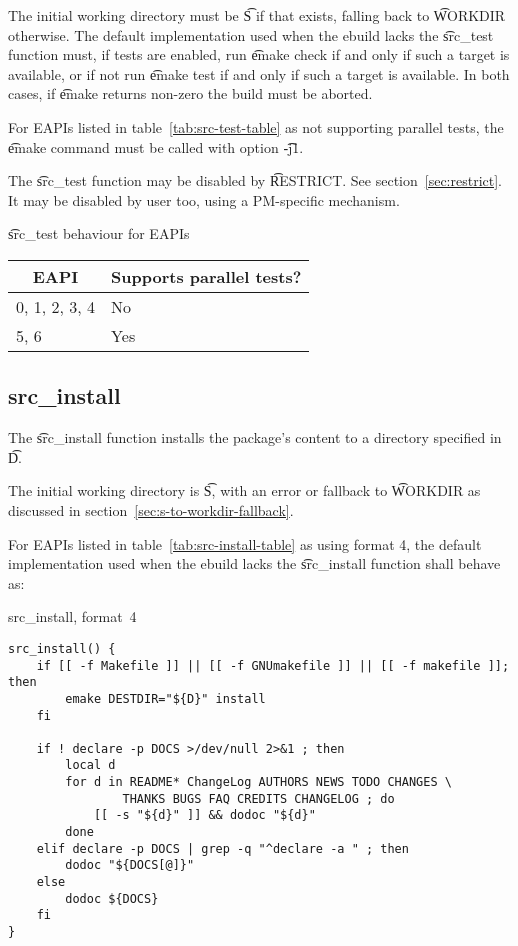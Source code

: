 The initial working directory must be \t{S} if that exists, falling back to \t{WORKDIR} otherwise.
The default implementation used when the ebuild lacks the \t{src\_test} function must, if tests are
enabled, run \t{emake check} if and only if such a target is available, or if not run
\t{emake test} if and only if such a target is available. In both cases, if \t{emake} returns
non-zero the build must be aborted.

 For EAPIs listed in table~\ref{tab:src-test-table} as not supporting
parallel tests, the \t{emake} command must be called with option \t{-j1}.

The \t{src\_test} function may be disabled by \t{RESTRICT}\@. See section~\ref{sec:restrict}. It may
be disabled by user too, using a PM-specific mechanism.

\begin{centertable}{\t{src\_test} behaviour for EAPIs}
    \label{tab:src-test-table}
    \begin{tabular}{ll}
      \toprule
      \multicolumn{1}{c}{\textbf{EAPI}} &
      \multicolumn{1}{c}{\textbf{Supports parallel tests?}} \\
      \midrule
      0, 1, 2, 3, 4     & No  \\
      5, 6              & Yes \\
      \bottomrule
    \end{tabular}
\end{centertable}

\subsection{src\_install}
\label{sec:src-install-function}

 The \t{src\_install} function installs the package's content to a
directory specified in \t{D}.

The initial working directory is \t{S}, with an error or fallback to \t{WORKDIR} as discussed in
section~\ref{sec:s-to-workdir-fallback}.

 For EAPIs listed in table~\ref{tab:src-install-table} as using format
4, the default implementation used when the ebuild lacks the \t{src\_install} function shall behave
as:

\begin{listing}[H]
\caption{src\_install, format~4} \label{lst:src-install-4}
\begin{verbatim}
src_install() {
    if [[ -f Makefile ]] || [[ -f GNUmakefile ]] || [[ -f makefile ]]; then
        emake DESTDIR="${D}" install
    fi

    if ! declare -p DOCS >/dev/null 2>&1 ; then
        local d
        for d in README* ChangeLog AUTHORS NEWS TODO CHANGES \
                THANKS BUGS FAQ CREDITS CHANGELOG ; do
            [[ -s "${d}" ]] && dodoc "${d}"
        done
    elif declare -p DOCS | grep -q "^declare -a " ; then
        dodoc "${DOCS[@]}"
    else
        dodoc ${DOCS}
    fi
}
\end{verbatim}
\end{listing}

